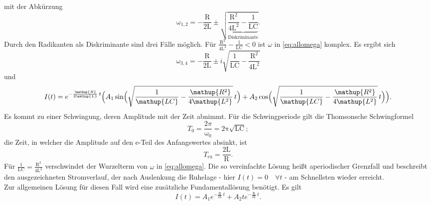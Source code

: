 mit der Abkürzung
\begin{equation}
	\mathup{\omega_{1,2}}= -\frac{\mathup{R}}{2\mathup{L}}\pm\sqrt{\underbrace{\frac{\mathup{R^2}}{4\mathup{L^2}}-\frac{1}{\mathup{LC}}}_{\text{Diskriminante}}}.
	\label{eq:allomega}
\end{equation}
Durch den Radikanten als Diskriminante sind drei Fälle möglich.
Für $\frac{\mathup{R^2}}{4\mathup{L^2}}-\frac{1}{\mathup{LC}}<0$ ist $\omega$ in \eqref{eq:allomega} komplex.
Es ergibt sich
\begin{equation}
	\mathup{\omega_{3,4}}= -\frac{\mathup{R}}{2\mathup{L}}\pm i\sqrt{\frac{1}{\mathup{LC}}-\frac{\mathup{R^2}}{4\mathup{L^2}}}
\end{equation}
und
\begin{equation}
	I(t) = e^{-\frac{\mathup{R}}{2\mathup{L}}\,t}\Bigl(A_1 \sin\Bigl(\sqrt{\frac{1}{\mathup{LC}}-\frac{\mathup{R^2}}{4\mathup{L^2}}}\, t\Bigr)+A_2 \cos\Bigl(\sqrt{\frac{1}{\mathup{LC}}-\frac{\mathup{R^2}}{4\mathup{L^2}}}\,t\Bigr)\Bigr).
	\label{eq:schwingloesung}
\end{equation}
Es kommt zu einer Schwingung, deren Amplitude mit der Zeit abnimmt. 
Für die Schwingperiode gilt die Thomsonsche Schwingformel
\begin{equation}
	T_0 = \frac{2π}{\mathup{ω_0}} = \mathup{2π \sqrt{LC}};
	\label{eq:thomson}
\end{equation} 
die Zeit, in welcher die Amplitude auf den e-Teil des Anfangswertes absinkt, ist
\begin{equation}
	T_\text{ex} = \frac{\text{2L}}{\text{R}}.
	\label{eq:abkling}
\end{equation}
Für $\frac{1}{\mathup{LC}}=\frac{\mathup{R^2}}{4\mathup{L^2}}$ 
verschwindet der Wurzelterm von $\omega$ in \eqref{eq:allomega}.
Die so vereinfachte Lösung heißt aperiodischer Grenzfall und beschreibt den ausgezeichneten Stromverlauf, der nach Auslenkung die Ruhelage - hier $I(t)=0 \quad\forall t$ - am Schnellsten wieder erreicht.\\
Zur allgemeinen Lösung für diesen Fall wird eine zusätzliche Fundamentallösung benötigt.
Es gilt
\begin{equation}
	I(t) = A_1 e^{-\frac{\mathup{R}}{2\mathup{L}}\,t}+A_2 t e^{-\frac{\mathup{R}}{2\mathup{L}}\,t}.
\end{equation}
